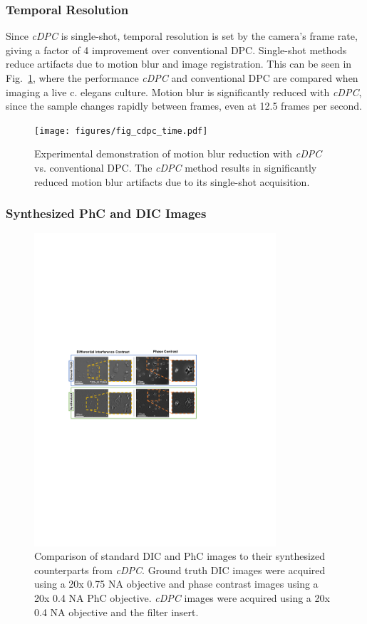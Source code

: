 \subsubsection{Temporal Resolution}
Since \textit{cDPC} is single-shot, temporal resolution is set by the camera's frame rate, giving a factor of 4 improvement over conventional DPC. Single-shot methods reduce artifacts due to motion blur and image registration. This can be seen in Fig.~\ref{fig:temporalRes}, where the performance \textit{cDPC} and conventional DPC are compared when imaging a live c. elegans culture. Motion blur is significantly reduced with \textit{cDPC}, since the sample changes rapidly between frames, even at 12.5 frames per second.

\begin{figure}[tbh]
\centering
\texttt{[image: figures/fig\_cdpc\_time.pdf]}
\caption{\label{fig:temporalRes}
Experimental demonstration of motion blur reduction with \textit{cDPC} vs. conventional DPC. The \textit{cDPC} method results in significantly reduced motion blur artifacts due to its single-shot acquisition.}
\end{figure}

\subsubsection{Synthesized PhC and DIC Images}

\begin{figure}[tbh]
\centering
\includegraphics[width=0.8\textwidth]{figures/fig_cdpc_dic.pdf}
\caption{\label{fig:synthDIC_PC}
Comparison of standard DIC and PhC images to their synthesized counterparts from \textit{cDPC}. Ground truth DIC images were acquired using a 20x 0.75 NA objective and phase contrast images using a 20x 0.4 NA PhC objective. \textit{cDPC} images were acquired using a 20x 0.4 NA objective and the filter insert.}\end{figure}

